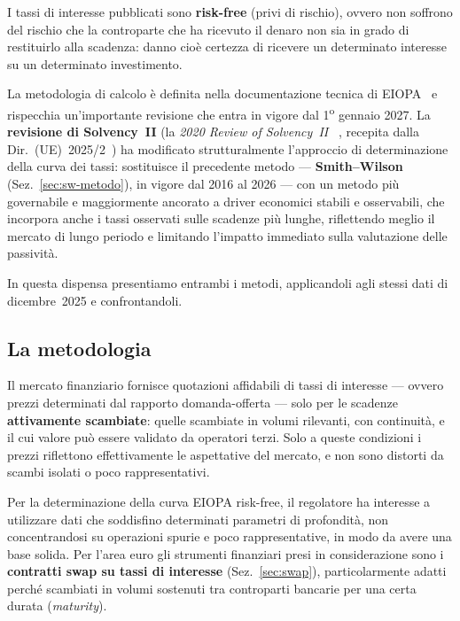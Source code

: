 \documentclass[11pt,a4paper]{article}
\theoremstyle{plain}
\theoremstyle{definition}
\theoremstyle{remark}
\begin{document}
I tassi di interesse pubblicati sono \textbf{risk-free} (privi di rischio), ovvero non
soffrono del rischio che la controparte che ha ricevuto il denaro non sia in grado di
restituirlo alla scadenza: danno cio\`e certezza di ricevere un determinato interesse su un
determinato investimento.

La metodologia
di calcolo \`e definita nella documentazione tecnica di EIOPA~\cite{eiopa2026} e rispecchia
un'importante revisione che entra in vigore dal 1\textsuperscript{o} gennaio 2027. 
La \textbf{revisione di Solvency~II} (la \emph{2020 Review of Solvency~II}%
~\cite{eiopa2020opinion}, recepita dalla Dir.~(UE)~2025/2~\cite{dir2025}) 
ha modificato strutturalmente l'approccio di determinazione della curva dei tassi: sostituisce
il precedente metodo --- \textbf{Smith--Wilson} (Sez.~\ref{sec:sw-metodo}), in vigore dal 2016
al 2026 --- con un metodo
più governabile e maggiormente ancorato a driver economici stabili e osservabili, che
incorpora anche i tassi osservati sulle scadenze pi\`u lunghe, riflettendo meglio il mercato di
lungo periodo e limitando l'impatto immediato sulla valutazione delle passivit\`a.

In questa dispensa presentiamo entrambi i metodi, applicandoli agli stessi dati di dicembre~2025 e confrontandoli.

\subsection{La metodologia}
\label{sec:metodologia-dlt}

Il mercato finanziario fornisce quotazioni affidabili di tassi di interesse --- ovvero prezzi
determinati dal rapporto domanda-offerta --- solo per le scadenze \textbf{attivamente
scambiate}: quelle scambiate in volumi rilevanti, con continuit\`a, e il cui valore pu\`o
essere validato da operatori terzi. Solo a queste condizioni i prezzi riflettono
effettivamente le aspettative del mercato, e non sono distorti da scambi isolati o poco
rappresentativi.

Per la determinazione della curva EIOPA risk-free, il regolatore ha interesse a utilizzare dati che soddisfino determinati parametri
di profondit\`a, non concentrandosi su operazioni spurie e poco rappresentative, in modo da avere una base solida.
Per l'area euro gli strumenti finanziari presi in considerazione sono i \textbf{contratti swap su
tassi di interesse} (Sez.~\ref{sec:swap}), particolarmente adatti perch\'e scambiati in volumi sostenuti tra controparti bancarie per una certa
durata (\emph{maturity}).
\end{document}
